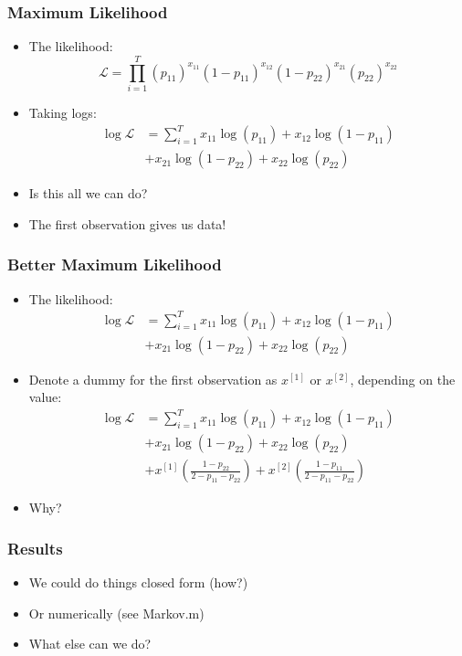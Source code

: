 \documentclass{beamer}
\begin{document}
\begin{frame}
\frametitle[alignment=center]{Maximum Likelihood}
\begin{itemize}
\item The likelihood:
$$\mathcal{L}=\prod_{i=1}^T (p_{11})^{x_{11}}(1-p_{11})^{x_{12}}(1-p_{22})^{x_{21}}(p_{22})^{x_{22}}$$
\item Taking logs:
\begin{align*}
\log\mathcal{L} & =\sum_{i=1}^T x_{11}\log(p_{11})+x_{12}\log(1-p_{11})\\
 & +x_{21}\log(1-p_{22})+x_{22}\log(p_{22})
 \end{align*}
\item Is this all we can do? 
\bigskip
\item<3-> The first observation gives us data!

\end{itemize}
\end{frame}


\begin{frame}
\frametitle[alignment=center]{Better Maximum Likelihood}
\begin{itemize}
\item The likelihood:
\begin{align*}
\log\mathcal{L} & =\sum_{i=1}^T x_{11}\log(p_{11})+x_{12}\log(1-p_{11})\\
 & +x_{21}\log(1-p_{22})+x_{22}\log(p_{22})
 \end{align*}
\bigskip
\item Denote a dummy for the first observation as $x^{[1]}$ or $x^{[2]}$, depending on the value:
\begin{align*}
\log\mathcal{L} & =\sum_{i=1}^T x_{11}\log(p_{11})+x_{12}\log(1-p_{11})\\
 & +x_{21}\log(1-p_{22})+x_{22}\log(p_{22}) \\
 & +x^{[1]}\left(\frac{1-p_{22}}{2-p_{11}-p_{22}}\right)+x^{[2]}\left(\frac{1-p_{11}}{2-p_{11}-p_{22}}\right)
 \end{align*}
 \item Why?
\end{itemize}
\end{frame}


\begin{frame}
\frametitle[alignment=center]{Results}
\begin{itemize}
\item We could do things closed form (how?)
\bigskip
\item Or numerically (see Markov.m)
\bigskip
\item What else can we do?
\end{itemize}
\end{frame}
\end{document}
